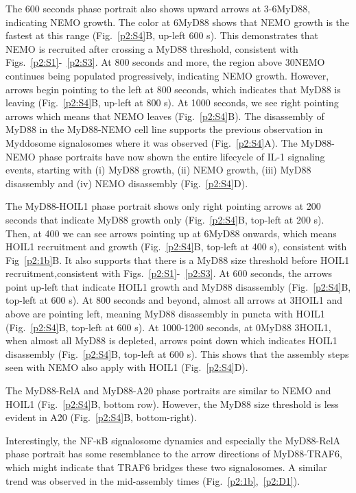 The 600 seconds phase portrait also shows upward arrows at 3-6\times MyD88, indicating NEMO growth. The color at 6\times MyD88 shows that NEMO growth is the fastest at this range (Fig.~\ref{p2:S4}B, up-left 600 s). This demonstrates that NEMO is recruited after crossing a MyD88 threshold, consistent with Figs.~\ref{p2:S1}-~\ref{p2:S3}. At 800 seconds and more, the region above 30\times NEMO continues being populated progressively, indicating NEMO growth. However, arrows begin pointing to the left at 800 seconds, which indicates that MyD88 is leaving (Fig.~\ref{p2:S4}B, up-left at 800 s). At 1000 seconds, we see right pointing arrows which means that NEMO leaves (Fig.~\ref{p2:S4}B). The disassembly of MyD88 in the MyD88-NEMO cell line supports the previous observation in Myddosome signalosomes where it was observed (Fig.~\ref{p2:S4}A). The MyD88-NEMO phase portraits have now shown the entire lifecycle of IL-1 signaling events, starting with (i) MyD88 growth, (ii) NEMO growth, (iii) MyD88 disassembly and (iv) NEMO disassembly (Fig.~\ref{p2:S4}D).

The MyD88-HOIL1 phase portrait shows only right pointing arrows at 200 seconds that indicate MyD88 growth only (Fig.~\ref{p2:S4}B, top-left at 200 s). Then, at 400 we can see arrows pointing up at 6\times MyD88 onwards, which means HOIL1 recruitment and growth (Fig.~\ref{p2:S4}B, top-left at 400 s), consistent with Fig~\ref{p2:1b}B. It also supports that there is a MyD88 size threshold before HOIL1 recruitment,consistent with Figs.~\ref{p2:S1}-~\ref{p2:S3}. At 600 seconds, the arrows point up-left that indicate HOIL1 growth and MyD88 disassembly (Fig.~\ref{p2:S4}B, top-left at 600 s). At 800 seconds and beyond, almost all arrows at 3\times HOIL1 and above are pointing left, meaning MyD88 disassembly in puncta with HOIL1 (Fig.~\ref{p2:S4}B, top-left at 600 s). At 1000-1200 seconds, at 0\times MyD88 3\times HOIL1, when almost all MyD88 is depleted, arrows point down which indicates HOIL1 disassembly (Fig.~\ref{p2:S4}B, top-left at 600 s). This shows that the assembly steps seen with NEMO also apply with HOIL1 (Fig.~\ref{p2:S4}D).

The MyD88-RelA and MyD88-A20 phase portraits are similar to NEMO and HOIL1 (Fig.~\ref{p2:S4}B, bottom row). However, the MyD88 size threshold is less evident in A20 (Fig.~\ref{p2:S4}B, bottom-right).

Interestingly, the NF-κB signalosome dynamics and especially the MyD88-RelA phase portrait has some resemblance to the arrow directions of MyD88-TRAF6, which might indicate that TRAF6 bridges these two signalosomes. A similar trend was observed in the mid-assembly times (Fig.~\ref{p2:1b},~\ref{p2:D1}).

